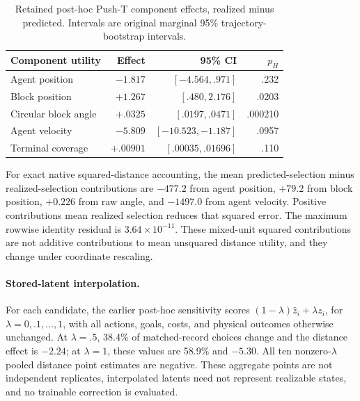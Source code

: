 \documentclass{article}
\begin{document}
\begin{table}[h]
\caption{Retained post-hoc Push-T component effects, realized minus predicted.
Intervals are original marginal 95\% trajectory-bootstrap intervals.}
\label{tab:components}
\centering
\begin{tabular}{lrrr}
\toprule
Component utility & Effect & 95\% CI & $p_H$\\
\midrule
Agent position & $-1.817$ & $[-4.564,.971]$ & .232\\
Block position & $+1.267$ & $[.480,2.176]$ & .0203\\
Circular block angle & $+.0325$ & $[.0197,.0471]$ & .000210\\
Agent velocity & $-5.809$ & $[-10.523,-1.187]$ & .0957\\
Terminal coverage & $+.00901$ & $[.00035,.01696]$ & .110\\
\bottomrule
\end{tabular}
\end{table}

For exact native squared-distance accounting, the mean predicted-selection
minus realized-selection contributions are $-477.2$ from agent position,
$+79.2$ from block position, $+0.226$ from raw angle, and $-1497.0$ from agent
velocity. Positive contributions mean realized selection reduces that squared
error. The maximum rowwise identity residual is $3.64\times10^{-11}$.
These mixed-unit squared contributions are not additive contributions to mean
unsquared distance utility, and they change under coordinate rescaling.

\paragraph{Stored-latent interpolation.}
For each candidate, the earlier post-hoc sensitivity scores
$(1-\lambda)\hat z_i+\lambda z_i$, for $\lambda=0,.1,\ldots,1$, with all
actions, goals, costs, and physical outcomes otherwise unchanged. At
$\lambda=.5$, 38.4\% of matched-record choices change and the distance effect
is $-2.24$; at $\lambda=1$, these values are 58.9\% and $-5.30$.
All ten nonzero-$\lambda$ pooled distance point estimates are negative.
These aggregate points are not independent replicates, interpolated latents
need not represent realizable states, and no trainable correction is evaluated.
\end{document}
